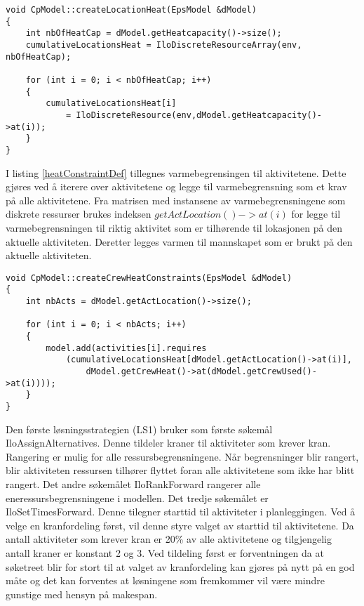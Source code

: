{\tiny %
\begin{lstlisting}[label=heatCodeDef,caption=Oppretting av varmebegrensing]
void CpModel::createLocationHeat(EpsModel &dModel)
{
	int nbOfHeatCap = dModel.getHeatcapacity()->size();
	cumulativeLocationsHeat = IloDiscreteResourceArray(env, nbOfHeatCap);

	for (int i = 0; i < nbOfHeatCap; i++)
	{
		cumulativeLocationsHeat[i] 
			= IloDiscreteResource(env,dModel.getHeatcapacity()->at(i));
	}
}
\end{lstlisting}
} %

I listing \ref{heatConstraintDef} tillegnes varmebegrensingen til aktivitetene. Dette gjøres ved å iterere over aktivitetene og legge til varmebegrensning som et krav på alle aktivitetene. Fra matrisen med instansene av varmebegrensningene som diskrete ressurser brukes indeksen $getActLocation()->at(i)$ for legge til varmebegrensningen til riktig aktivitet som er tilhørende til lokasjonen på den aktuelle aktiviteten. Deretter legges varmen til mannskapet som er brukt på den aktuelle aktiviteten.

{\tiny %
\begin{lstlisting}[label=heatConstraintDef,caption=Tilegning av varmebegrensing til aktiviteter]
void CpModel::createCrewHeatConstraints(EpsModel &dModel)
{
	int nbActs = dModel.getActLocation()->size();

	for (int i = 0; i < nbActs; i++)
	{
		model.add(activities[i].requires
			(cumulativeLocationsHeat[dModel.getActLocation()->at(i)], 
				dModel.getCrewHeat()->at(dModel.getCrewUsed()->at(i))));
	}
}
\end{lstlisting}
} %

Den første løsningsstrategien (LS1) bruker som første søkemål IloAssignAlternatives. Denne tildeler kraner til aktiviteter som krever kran. Rangering er mulig for alle ressursbegrensningene. Når begrensninger blir rangert, blir aktiviteten ressursen tilhører flyttet foran alle aktivitetene som ikke har blitt rangert. Det andre søkemålet IloRankForward rangerer alle eneressursbegrensningene i modellen. Det tredje søkemålet er IloSetTimesForward. Denne tilegner starttid til aktiviteter i planleggingen. Ved å velge en kranfordeling først, vil denne styre valget av starttid til aktivitetene. Da antall aktiviteter som krever kran er 20\% av alle aktivitetene og tilgjengelig antall kraner er konstant 2 og 3. Ved tildeling først er forventningen da at søketreet blir for stort til at valget av kranfordeling kan gjøres på nytt på en god måte og det kan forventes at løsningene som fremkommer vil være mindre gunstige med hensyn på makespan.

